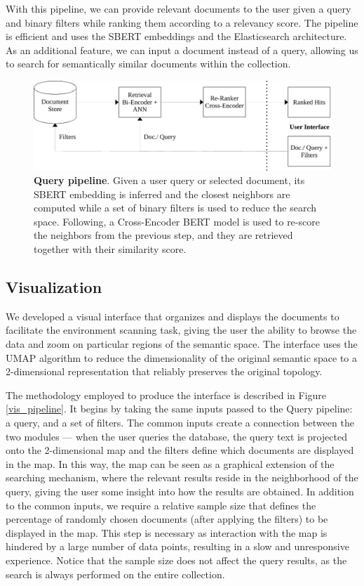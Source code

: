\documentclass[a4paper]{article}
\begin{document}
With this pipeline, we can provide relevant documents to the user given a query and binary filters while ranking them according to a relevancy score. The pipeline is efficient and uses the SBERT embeddings and the Elasticsearch architecture. As an additional feature, we can input a document instead of a query, allowing us to search for semantically similar documents within the collection.

\begin{figure}[H]
  \centering
  \includegraphics[scale=0.7]{./assets/query_pipeline}
  \caption{\textbf{Query pipeline}. Given a user query or selected document, its SBERT embedding is inferred and the closest neighbors are computed while a set of binary filters is used to reduce the search space. Following, a Cross-Encoder BERT model is used to re-score the neighbors from the previous step, and they are retrieved together with their similarity score.}
  \label{query_pipeline}
\end{figure}

\subsection{Visualization}
We developed a visual interface that organizes and displays the documents to facilitate the environment scanning task, giving the user the ability to browse the data and zoom on particular regions of the semantic space. The interface uses the UMAP algorithm to reduce the dimensionality of the original semantic space to a 2-dimensional representation that reliably preserves the original topology.

The methodology employed to produce the interface is described in Figure \ref{vis_pipeline}. It begins by taking the same inputs passed to the Query pipeline: a query, and a set of filters. The common inputs create a connection between the two modules — when the user queries the database, the query text is projected onto the 2-dimensional map and the filters define which documents are displayed in the map. In this way, the map can be seen as a graphical extension of the searching mechanism, where the relevant results reside in the neighborhood of the query, giving the user some insight into how the results are obtained. In addition to the common inputs, we require a relative sample size that defines the percentage of randomly chosen documents (after applying the filters) to be displayed in the map. This step is necessary as interaction with the map is hindered by a large number of data points, resulting in a slow and unresponsive experience. Notice that the sample size does not affect the query results, as the search is always performed on the entire collection.
\end{document}
